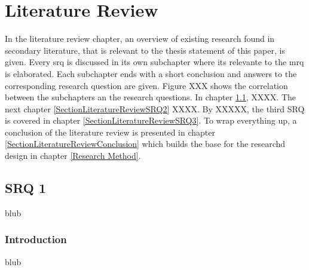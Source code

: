 
\chapter{Literature Review} %

\label{ChapterLiteratureReview} %

In the literature review chapter, an overview of existing research found in secondary literature, that is relevant to the thesis statement of this paper, is given. Every \gls{srq} is discussed in its own subchapter where its relevante to the \gls{mrq} is elaborated. Each subchapter ends with a short conclusion and answers to the corresponding research question are given.
Figure XXX shows the correlation between the subchapters an the research questions. In chapter \ref{SectionLiteratureReviewSRQ1}, XXXX. The next chapter \ref{SectionLiteratureReviewSRQ2} XXXX. By XXXXX, the third SRQ is covered in chapter \ref{SectionLiteratureReviewSRQ3}. To wrap everything up, a conclusion of the literature review is presented in chapter \ref{SectionLiteratureReviewConclusion} which builds the base for the researchd design in chapter \ref{Research Method}.




\section{SRQ 1}

\label{SectionLiteratureReviewSRQ1}

blub


\subsection{Introduction}

blub



